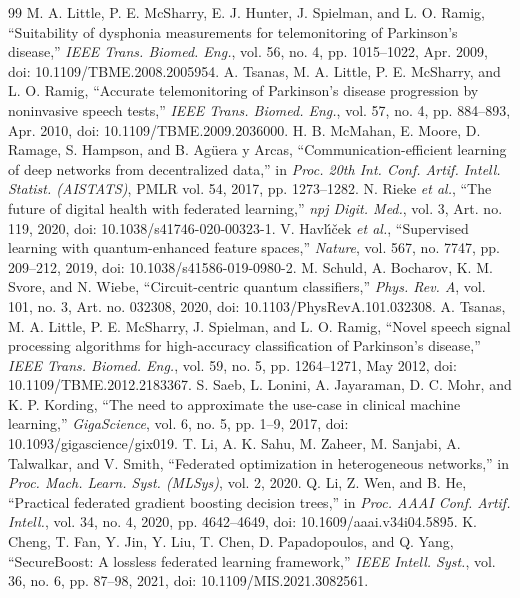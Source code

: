 \documentclass[conference,a4paper]{IEEEtran}
\begin{document}
\begin{thebibliography}{99}\footnotesize
{} M. A. Little, P. E. McSharry, E. J. Hunter, J. Spielman, and L. O. Ramig, ``Suitability of dysphonia measurements for telemonitoring of Parkinson's disease,'' \textit{IEEE Trans. Biomed. Eng.}, vol. 56, no. 4, pp. 1015--1022, Apr. 2009, doi: 10.1109/TBME.2008.2005954.
 A. Tsanas, M. A. Little, P. E. McSharry, and L. O. Ramig, ``Accurate telemonitoring of Parkinson's disease progression by noninvasive speech tests,'' \textit{IEEE Trans. Biomed. Eng.}, vol. 57, no. 4, pp. 884--893, Apr. 2010, doi: 10.1109/TBME.2009.2036000.
 H. B. McMahan, E. Moore, D. Ramage, S. Hampson, and B. Ag\"uera y Arcas, ``Communication-efficient learning of deep networks from decentralized data,'' in \textit{Proc. 20th Int. Conf. Artif. Intell. Statist. (AISTATS)}, PMLR vol. 54, 2017, pp. 1273--1282.
 N. Rieke \textit{et al.}, ``The future of digital health with federated learning,'' \textit{npj Digit. Med.}, vol. 3, Art. no. 119, 2020, doi: 10.1038/s41746-020-00323-1.
 V. Havl\'{\i}\v{c}ek \textit{et al.}, ``Supervised learning with quantum-enhanced feature spaces,'' \textit{Nature}, vol. 567, no. 7747, pp. 209--212, 2019, doi: 10.1038/s41586-019-0980-2.
 M. Schuld, A. Bocharov, K. M. Svore, and N. Wiebe, ``Circuit-centric quantum classifiers,'' \textit{Phys. Rev. A}, vol. 101, no. 3, Art. no. 032308, 2020, doi: 10.1103/PhysRevA.101.032308.
 A. Tsanas, M. A. Little, P. E. McSharry, J. Spielman, and L. O. Ramig, ``Novel speech signal processing algorithms for high-accuracy classification of Parkinson's disease,'' \textit{IEEE Trans. Biomed. Eng.}, vol. 59, no. 5, pp. 1264--1271, May 2012, doi: 10.1109/TBME.2012.2183367.
 S. Saeb, L. Lonini, A. Jayaraman, D. C. Mohr, and K. P. Kording, ``The need to approximate the use-case in clinical machine learning,'' \textit{GigaScience}, vol. 6, no. 5, pp. 1--9, 2017, doi: 10.1093/gigascience/gix019.
 T. Li, A. K. Sahu, M. Zaheer, M. Sanjabi, A. Talwalkar, and V. Smith, ``Federated optimization in heterogeneous networks,'' in \textit{Proc. Mach. Learn. Syst. (MLSys)}, vol. 2, 2020.
 Q. Li, Z. Wen, and B. He, ``Practical federated gradient boosting decision trees,'' in \textit{Proc. AAAI Conf. Artif. Intell.}, vol. 34, no. 4, 2020, pp. 4642--4649, doi: 10.1609/aaai.v34i04.5895.
 K. Cheng, T. Fan, Y. Jin, Y. Liu, T. Chen, D. Papadopoulos, and Q. Yang, ``SecureBoost: A lossless federated learning framework,'' \textit{IEEE Intell. Syst.}, vol. 36, no. 6, pp. 87--98, 2021, doi: 10.1109/MIS.2021.3082561.

\end{thebibliography}
\end{document}
